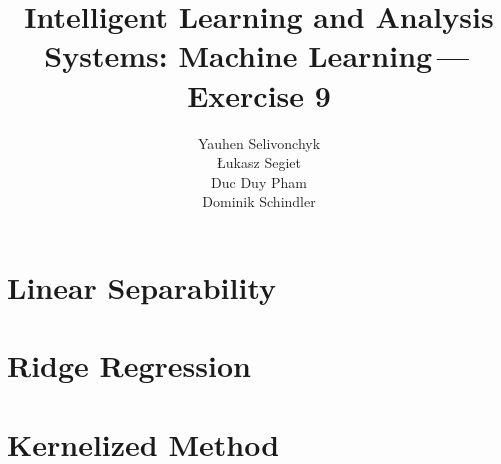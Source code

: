 \documentclass[a4paper]{article}
\newcommand{\exnumber}{9}
\begin{document}
\title{Intelligent Learning and Analysis Systems: Machine Learning\,---\,Exercise \exnumber}
\author{Yauhen Selivonchyk\\ {\L}ukasz Segiet\\Duc Duy Pham\\Dominik Schindler}

\maketitle

\section{Linear Separability}



\section{Ridge Regression}


\section{Kernelized Method}

\end{document}
